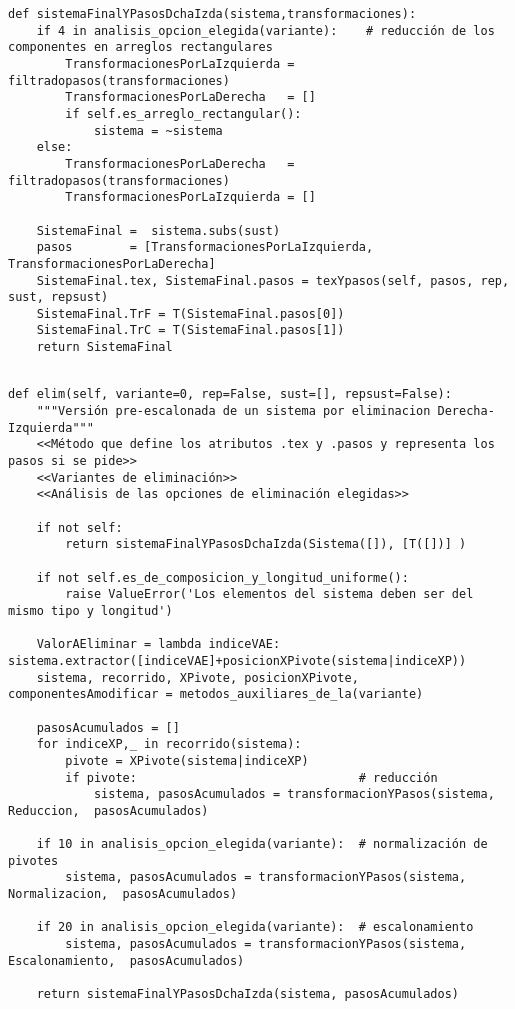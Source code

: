 \documentclass[11pt]{report}
\begin{document}
\begin{verbatim}
def sistemaFinalYPasosDchaIzda(sistema,transformaciones):
    if 4 in analisis_opcion_elegida(variante):    # reducción de los componentes en arreglos rectangulares
        TransformacionesPorLaIzquierda = filtradopasos(transformaciones)
        TransformacionesPorLaDerecha   = []
        if self.es_arreglo_rectangular():
            sistema = ~sistema
    else: 
        TransformacionesPorLaDerecha   = filtradopasos(transformaciones)
        TransformacionesPorLaIzquierda = []

    SistemaFinal =  sistema.subs(sust)
    pasos        = [TransformacionesPorLaIzquierda, TransformacionesPorLaDerecha]
    SistemaFinal.tex, SistemaFinal.pasos = texYpasos(self, pasos, rep, sust, repsust)
    SistemaFinal.TrF = T(SistemaFinal.pasos[0])
    SistemaFinal.TrC = T(SistemaFinal.pasos[1])
    return SistemaFinal

\end{verbatim}



\begin{verbatim}

def elim(self, variante=0, rep=False, sust=[], repsust=False):
    """Versión pre-escalonada de un sistema por eliminacion Derecha-Izquierda"""
    <<Método que define los atributos .tex y .pasos y representa los pasos si se pide>>
    <<Variantes de eliminación>>
    <<Análisis de las opciones de eliminación elegidas>>
    
    if not self:
        return sistemaFinalYPasosDchaIzda(Sistema([]), [T([])] )
    
    if not self.es_de_composicion_y_longitud_uniforme():
        raise ValueError('Los elementos del sistema deben ser del mismo tipo y longitud')
    
    ValorAEliminar = lambda indiceVAE: sistema.extractor([indiceVAE]+posicionXPivote(sistema|indiceXP))
    sistema, recorrido, XPivote, posicionXPivote, componentesAmodificar = metodos_auxiliares_de_la(variante)
    
    pasosAcumulados = []
    for indiceXP,_ in recorrido(sistema):
        pivote = XPivote(sistema|indiceXP)        
        if pivote:                               # reducción
            sistema, pasosAcumulados = transformacionYPasos(sistema,  Reduccion,  pasosAcumulados)
            
    if 10 in analisis_opcion_elegida(variante):  # normalización de pivotes
        sistema, pasosAcumulados = transformacionYPasos(sistema,  Normalizacion,  pasosAcumulados)

    if 20 in analisis_opcion_elegida(variante):  # escalonamiento
        sistema, pasosAcumulados = transformacionYPasos(sistema, Escalonamiento,  pasosAcumulados)

    return sistemaFinalYPasosDchaIzda(sistema, pasosAcumulados)
        
\end{verbatim}
\end{document}
